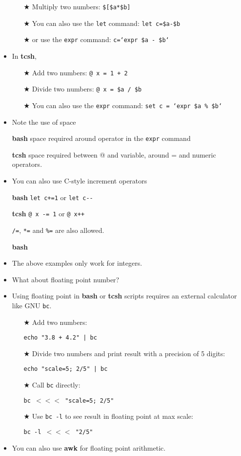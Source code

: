 \documentclass[10pt,t]{beamer}
\begin{document}
\begin{frame}
\begin{itemize}
\begin{enumerate}
      \item[$\bigstar$] Multiply two numbers: \texttt{\$[\$a*\$b]}
      \item[$\bigstar$] You can also use the \texttt{let} command: \texttt{let c=\$a-\$b}
      \item[$\bigstar$] or use the \texttt{expr} command: \texttt{c=`expr \$a - \$b`}
    \end{enumerate}
    \framebreak
    \item In \textbf{tcsh},
    \begin{enumerate}
      \item[$\bigstar$] Add two numbers: \texttt{@ x = 1 + 2}
      \item[$\bigstar$] Divide two numbers: \texttt{@ x = \$a / \$b}
      \item[$\bigstar$] You can also use the \texttt{expr} command: \texttt{set c = `expr \$a \% \$b`}
    \end{enumerate}
    \item Note the use of space
    \item[\textbf{bash}] space required around operator in the \texttt{expr} command
    \item[\textbf{tcsh}] space required between @ and variable, around = and numeric operators. 
    \item You can also use C-style increment operators
    \item[\textbf{bash}] \texttt{let c+=1} or \texttt{let c-{}-}
    \item[\textbf{tcsh}] \texttt{@ x -= 1} or \texttt{@ x++}
    \item[] \texttt{/=}, \texttt{*=} and \texttt{\%=} are also allowed.
    \item[\textbf{bash}]
    \item The above examples only work for integers.
    \item What about floating point number?
    \framebreak
    \item Using floating point in \textbf{bash} or \textbf{tcsh} scripts requires an external calculator like GNU \texttt{bc}.
    \begin{enumerate}
        \item[$\bigstar$] Add two numbers:
        \item[]\texttt{echo "3.8 + 4.2" | bc}
        \item[$\bigstar$] Divide two numbers and print result with a precision of 5 digits:
        \item[]\texttt{echo "scale=5; 2/5" | bc}
        \item[$\bigstar$] Call \texttt{bc} directly:
        \item[]\texttt{bc $<<<$ "scale=5; 2/5"}
        \item[$\bigstar$] Use \texttt{bc -l} to see result in floating point at max scale:
        \item[] \texttt{bc -l $<<<$ "2/5"}
    \end{enumerate}
    \item You can also use \textbf{awk} for floating point arithmetic. 
  \end{itemize}
\end{frame}
\end{document}
